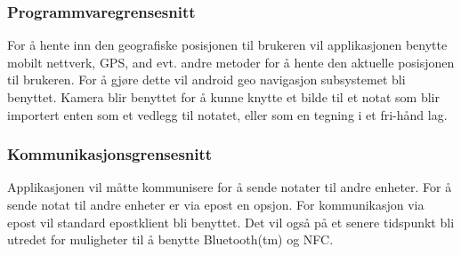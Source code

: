 \documentclass[a4paper, 12pt]{article}
\begin{document}
\subsubsection{Programmvaregrensesnitt}
For å hente inn den geografiske posisjonen til brukeren vil applikasjonen benytte mobilt nettverk, GPS, and evt. andre metoder for å hente den aktuelle posisjonen til brukeren. For å gjøre dette vil android geo navigasjon subsystemet bli benyttet. Kamera blir benyttet for å kunne knytte et bilde til et notat som blir importert enten som et vedlegg til notatet, eller som en tegning i et fri-hånd lag.

\subsubsection{Kommunikasjonsgrensesnitt}
Applikasjonen vil måtte kommunisere for å sende notater til andre enheter. For å sende notat til andre enheter er via epost en opsjon. For kommunikasjon via epost vil standard epostklient bli benyttet. Det vil også på et senere tidspunkt bli utredet for muligheter til å benytte Bluetooth(tm) og NFC.
\end{document}
